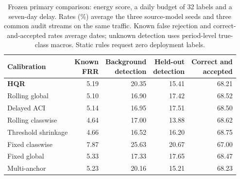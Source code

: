 \begin{table}[tb]
\centering
\small
\caption{Frozen primary comparison: energy score, a daily budget of 32 labels and a seven-day delay. Rates (\%) average the three source-model seeds and three common audit streams on the same traffic. Known false rejection and correct-and-accepted rates average dates; unknown detection uses period-level true-class macros. Static rules request zero deployment labels.}
\label{tab:primary}
\setlength{\tabcolsep}{4pt}
\begin{tabular}{lrrrr}
\toprule
Calibration & \shortstack{Known\\FRR} & \shortstack{Background\\detection} & \shortstack{Held-out\\detection} & \shortstack{Correct and\\accepted} \\
\midrule
\textbf{HQR} & 5.19 & 20.35 & 15.41 & 68.21 \\
Rolling global & 5.10 & 16.90 & 17.42 & 68.52 \\
Delayed ACI & 5.14 & 16.95 & 17.51 & 68.50 \\
Rolling classwise & 4.64 & 17.00 & 13.88 & 68.62 \\
Threshold shrinkage & 4.66 & 16.52 & 16.20 & 68.75 \\
Fixed classwise & 7.87 & 25.63 & 20.67 & 67.00 \\
Fixed global & 5.33 & 17.33 & 17.65 & 68.47 \\
Multi-anchor & 5.23 & 20.16 & 15.21 & 68.23 \\
\bottomrule
\end{tabular}
\end{table}
